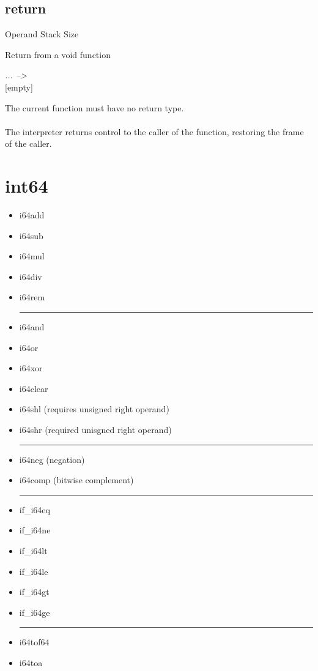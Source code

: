 \documentclass[12pt]{article}
\begin{document}
		\subsection*{return}
			\begin{labeling}{Operand Stack Size}
				\item [\textbf{Operation}] Return from a void function
				\item [\textbf{Format}] 
				\item [\textbf{Operand Stack}] \textit{... --\textgreater } \\
										{[empty]}
				\item [\textbf{Description}] 	The current function must have no return type. \\ \\
				The interpreter returns control to the caller of the function, restoring the frame of the caller. 
			\end{labeling} 
		\newpage


	\section{int64}
		\begin{itemize}
			\item i64add
			\item i64sub
			\item i64mul
			\item i64div
			\item i64rem
			\\ \hrule
			\item i64and
			\item i64or
			\item i64xor
			\item i64clear
			\item i64shl (requires unsigned right operand)
			\item i64shr (required unisgned right operand)
			\\ \hrule
			\item i64neg (negation)
			\item i64comp (bitwise complement)
			\\ \hrule
			\item if\_i64eq
			\item if\_i64ne
			\item if\_i64lt
			\item if\_i64le
			\item if\_i64gt
			\item if\_i64ge
			\\ \hrule
			\item i64tof64
			\item i64toa
		\end{itemize}
		\newpage
\end{document}
